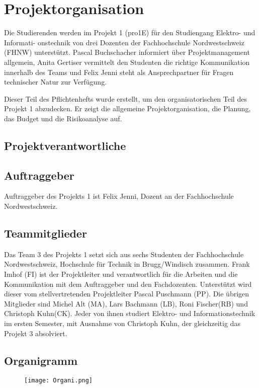\section{Projektorganisation}

Die Studierenden werden im Projekt 1 (pro1E) für den Studiengang Elektro- und Informati- onstechnik von drei Dozenten der Fachhochschule Nordwestschweiz (FHNW) unterstützt. Pascal Buchschacher informiert über Projektmanagement allgemein, Anita Gertiser vermittelt den Studenten die richtige Kommunikation innerhalb des Teams und Felix Jenni steht als Ansprechpartner für Fragen technischer Natur zur Verfügung.

Dieser Teil des Pflichtenhefts wurde erstellt, um den organisatorischen Teil des Projekt 1 abzudecken. Er zeigt die allgemeine Projektorganisation, die Planung, das Budget und die Risikoanalyse auf.
\subsection{Projektverantwortliche}

\subsection{Auftraggeber}
Auftraggeber des Projekts 1 ist Felix Jenni, Dozent an der Fachhochschule Nordwestschweiz.

\subsection{Teammitglieder}
Das Team 3 des Projekts 1 setzt sich aus sechs Studenten der Fachhochschule Nordwestschweiz, Hochschule für Technik in Brugg/Windisch zusammen. Frank Imhof (FI) ist der Projektleiter und verantwortlich für die Arbeiten und die Kommunikation mit dem Auftraggeber und den Fachdozenten. Unterstützt wird dieser vom stellvertretenden Projektleiter \newline Pascal Puschmann (PP). Die übrigen Mitglieder sind Michel Alt (MA), Lars Bachmann (LB), Roni Fischer(RB) und Christoph Kuhn(CK). Jeder von ihnen studiert Elektro- und Informationstechnik im ersten Semester, mit Ausnahme von Christoph Kuhn, der gleichzeitig das Projekt 3 absolviert.

\subsection{Organigramm}
\begin{figure}[H]
	\centering
	\texttt{[image: Organi.png]}
	\label{fig:Organigramm}
\end{figure}
